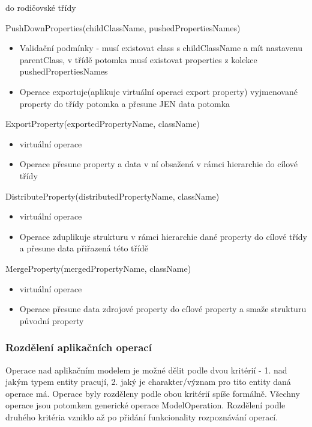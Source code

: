 \documentclass[11pt,twoside,a4paper]{book}
\begin{document}
\begin{list}{Operace :}{}
\begin{itemize}
    do rodičovské třídy
  \end{itemize}
  \item PushDownProperties(childClassName, pushedPropertiesNames)
  \begin{itemize}
    \item Validační podmínky - musí existovat class s childClassName a mít
    nastavenu parentClass, v třídě potomka musí existovat properties z kolekce
    pushedPropertiesNames
    \item Operace exportuje(aplikuje virtuální operaci export property) 
   vyjmenované property do třídy potomka a přesune JEN data potomka
  \end{itemize}
  \item ExportProperty(exportedPropertyName, className)
  \begin{itemize}
    \item virtuální operace
    \item Operace přesune property a data v ní obsažená v rámci hierarchie do
    cílové třídy
  \end{itemize}
  \item DistributeProperty(distributedPropertyName, className)
  \begin{itemize}
    \item virtuální operace
    \item Operace zduplikuje strukturu v rámci hierarchie dané property do
    cílové třídy a přesune data přiřazená této třídě
  \end{itemize}
  \item MergeProperty(mergedPropertyName, className)
  \begin{itemize}
    \item virtuální operace
    \item Operace přesune data zdrojové property do cílové property a smaže
    strukturu původní property
  \end{itemize}
\end{list}

\subsubsection {Rozdělení aplikačních operací} 

Operace nad aplikačním modelem je možné dělit podle dvou kritérií - 1. nad jakým
typem entity pracují, 2. jaký je charakter/význam pro tito entity daná operace
má. Operace byly rozděleny podle obou kritérií spíše formálně. Všechny operace
jsou potomkem generické operace ModelOperation. Rozdělení podle druhého kritéria
vzniklo až po přidání funkcionality rozpoznávání operací.
\end{document}
